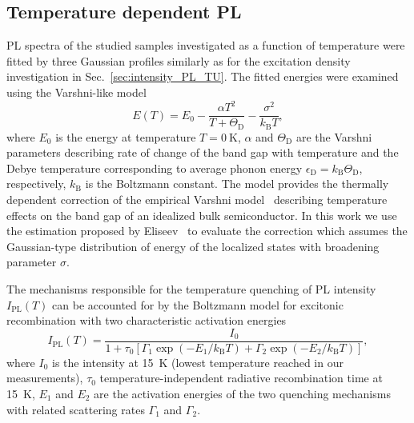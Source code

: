 \subsection{Temperature dependent PL}
\label{Sec:temp_PL_TU}
PL spectra of the studied samples investigated as a function of temperature were fitted by three Gaussian profiles similarly as for the excitation density investigation in Sec.~\ref{sec:intensity_PL_TU}. The fitted energies were examined using the Varshni-like model~\cite{Taiping2014}
%
\begin{equation}
E(T)=E_0-\frac{\alpha T^2}{T+\Theta_\mathrm{D}}-\frac{\sigma^2}{k_\mathrm{B}T}, \label{eq:Varshni-like}
\end{equation}
where $E_0$ is the energy at temperature $T=0~\mathrm{K}$, $\alpha$ and $\Theta_\mathrm{D}$ are the Varshni parameters describing rate of change of the band gap with temperature and the Debye temperature corresponding to average phonon energy $\epsilon_\mathrm{D}=k_\mathrm{B}\Theta_\mathrm{D}$, respectively, $k_\mathrm{B}$ is the Boltzmann constant. The model provides the thermally dependent correction of the empirical Varshni model~\citep{Varshni} describing temperature effects on the band gap of an idealized bulk semiconductor. In this work we use the estimation proposed by Eliseev~\citep{Eliseev_apl2003_PLtemp} to evaluate the correction which assumes the Gaussian-type distribution of energy of the localized states with broadening parameter $\sigma$.

The mechanisms responsible for the temperature quenching of PL intensity $I_\mathrm{PL}(T)$ can be accounted for by the Boltzmann model for excitonic recombination with two characteristic activation energies~\citep{Daly_prb1995, Alen_apl2011}
\begin{equation}
I_\mathrm{PL}(T)=\frac{I_0}{1+\tau_0\left[\Gamma_1\exp(-E_1/k_\mathrm{B}T)+\Gamma_2\exp(-E_2/k_\mathrm{B}T)\right]},               \label{eq:Arhenius}
\end{equation}
where $I_0$ is the intensity at 15~K (lowest temperature reached in our measurements), $\tau_0$ temperature-independent radiative recombination time at 15~K, $E_1$ and $E_2$ are the activation energies of the two quenching mechanisms with related scattering rates $\Gamma_1$ and $\Gamma_2$.%
\newpage
